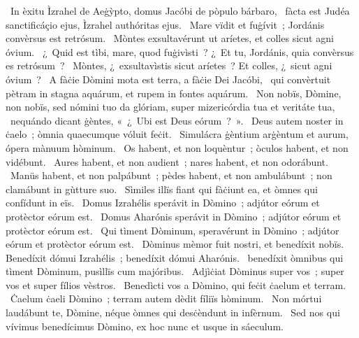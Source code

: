 ~In èxitu Ìzrahel de Aeġỳpto, domus Jacóbi de pòpulo bárbaro, 
~fàcta est Judéa sanctificáçio ejus, Ìzrahel authóritas ejus. 
~Mare vïdit et fuġívit~; Jordánis convèrsus est retrósum. 
~Mòntes exsultavérunt ut aríetes, et colles sicut agni óvium. 
~¿~Quid est tìbi, mare, quod fuġivìsti~? ¿~Et tu, Jordánis, quia convèrsus es retrósum~? 
~Mòntes, ¿~exsultavìstis sicut aríetes~? Et colles, ¿~sicut agni óvium~? 
~A fàċie Dòmini mota est terra, a fàċie Dei Jacóbi, 
~qui convèrtuit pètram in stagna aquárum, et rupem in fontes aquárum. 
~Non nobïs, Dòmine, non nobïs, sed nómini tuo da glóriam, super mizericórdia tua et veritáte tua, 
~nequándo dicant ġèntes, «~¿~Ubi est Deus eórum~?~». 
~Deus autem noster in ċaelo~; òmnia quaecumque vóluit feċit. 
~Simulácra ġèntium arġèntum et aurum, ópera mànuum hòminum. 
~Os habent, et non loquèntur~; òculos habent, et non vidébunt. 
~Aures habent, et non audient~; nares habent, et non odorábunt. 
~Manüs habent, et non palpábunt~; pèdes habent, et non ambulábunt~; non clamábunt in gùtture suo. 
~Sìmiles illïs fiant qui fàċiunt ea, et òmnes qui confídunt in eïs. 
~Domus Izrahélis sperávit in Dòmino~; adjútor eórum et protèctor eórum est. 
~Domus Aharónis sperávit in Dòmino~; adjútor eórum et protèctor eórum est. 
~Qui tìment Dòminum, speravérunt in Dòmino~; adjútor eórum et protèctor eórum est. 
~Dòminus mèmor fuit nostri, et benedíxit nobïs. Benedíxit dómui Izrahélis~; benedíxit dómui Aharónis. 
~benedíxit òmnibus qui tìment Dòminum, pusìllïs cum majóribus. 
~Adjìċiat Dòminus super vos~; super vos et super fílios vèstros. 
~Benedìcti vos a Dòmino, qui feċit ċaelum et terram. 
~Ċaelum ċaeli Dòmino~; terram autem dèdit fíliïs hòminum. 
~Non mórtui laudábunt te, Dòmine, néque òmnes qui desċèndunt in infèrnum. 
~Sed nos qui vívimus benedícimus Dòmino, ex hoc nunc et usque in sáeculum. 
